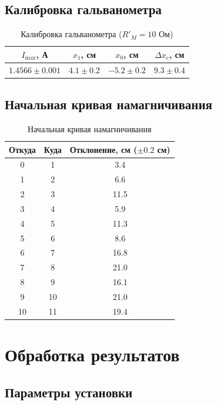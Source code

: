 \documentclass[a4paper]{article}
\begin{document}
	\subsection{Калибровка гальванометра}
	
	\begin{table}[h]
		\centering
		\caption{Калибровка гальванометра ($R'_M = 10$ Ом)}
		\label{tab:calib}
		\begin{tabular}{|c|c|c|c|}
			\hline
			$I_{\max}$, А & $x_1$, см & $x_0$, см & $\Delta x_c$, см \\
			\hline
			$1.4566 \pm 0.001$ & $4.1 \pm 0.2$ & $-5.2 \pm 0.2$ & $9.3 \pm 0.4$ \\
			\hline
		\end{tabular}
	\end{table}
	
	\subsection{Начальная кривая намагничивания}
	
	\begin{table}[h]
		\centering
		\caption{Начальная кривая намагничивания}
		\label{tab:initial}
		\begin{tabular}{|c|c|c|}
			\hline
			Откуда & Куда & Отклонение, см ($\pm 0.2$ см) \\
			\hline
			0 & 1 & 3.4 \\ \hline
			1 & 2 & 6.6 \\ \hline
			2 & 3 & 11.5 \\ \hline
			3 & 4 & 5.9 \\ \hline
			4 & 5 & 11.3 \\ \hline
			5 & 6 & 8.6 \\ \hline
			6 & 7 & 16.8 \\ \hline
			7 & 8 & 21.0 \\ \hline
			8 & 9 & 16.1 \\ \hline
			9 & 10 & 21.0 \\ \hline
			10 & 11 & 19.4 \\ \hline
		\end{tabular}
	\end{table}
	
	\section{Обработка результатов}
	
	\subsection{Параметры установки}
	
\end{document}
